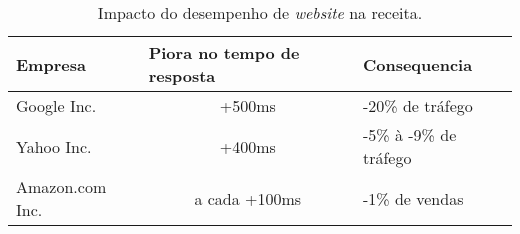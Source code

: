 \begin{table}[h]
	\centering
	\caption{Impacto do desempenho de \textit{website} na receita.\label{tab:impactodesempenho}}
	\begin{tabular}{lcl}
		\hline
			\textbf{Empresa} & \multicolumn{1}{l}{\textbf{Piora no tempo de resposta}} & \textbf{Consequencia}  \\
		\hline
			Google Inc.      & +500ms                                                  & -20\% de tráfego       \\
			Yahoo Inc.       & +400ms                                                  & -5\% à -9\% de tráfego \\
			Amazon.com Inc.  & a cada +100ms                                           & -1\% de vendas         \\           
		\hline
	\end{tabular}
\end{table}